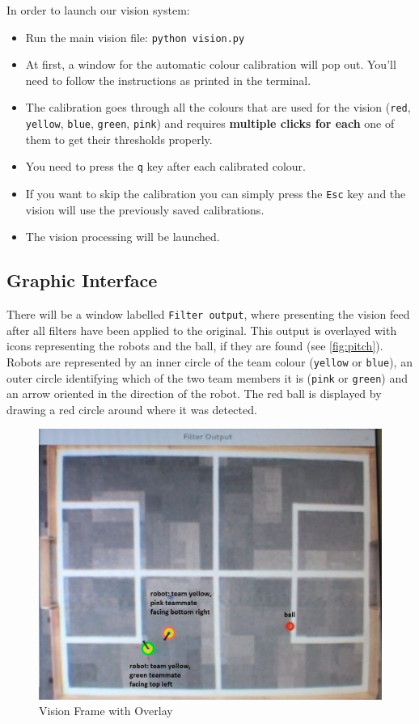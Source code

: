 In order to launch our vision system:
\begin{itemize}
\item Run the main vision file: \texttt{python vision.py}
\item At first, a window for the automatic colour calibration will pop out. You'll need to follow the instructions as printed in the terminal. 
\item The calibration goes through all the colours that are used for the vision (\texttt{red}, \texttt{yellow}, \texttt{blue}, \texttt{green}, \texttt{pink}) and requires \textbf{multiple clicks for each} one of them to get their thresholds properly.
\item You need to press the \texttt{q} key after each calibrated colour. 
\item If you want to skip the calibration you can simply press the \texttt{Esc} key and the vision will use the previously saved calibrations.
\item The vision processing will be launched.
\end{itemize}

\subsection{Graphic Interface}
There will be a window labelled \texttt{Filter output}, where presenting the vision feed after all filters have been applied to the original. This output is overlayed with icons representing the robots and the ball, if they are found (see \autoref{fig:pitch}). Robots are represented by an inner circle of the team colour (\texttt{yellow} or \texttt{blue}), an outer circle identifying which of the two team members it is (\texttt{pink} or \texttt{green}) and an arrow oriented in the direction of the robot.  The red ball is displayed by drawing a red circle around where it was detected. 

\begin{figure}[H]
\centering
\includegraphics[scale=0.2]{vision_pitch}
\caption{Vision Frame with Overlay}
\label{fig:pitch}
\end{figure}

